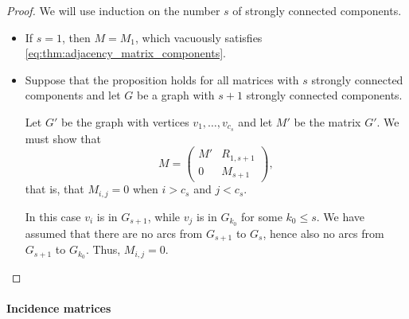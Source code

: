 \begin{proof}
  We will use induction on the number \( s \) of strongly connected components.
  \begin{itemize}
    \item If \( s = 1 \), then \( M = M_1 \), which vacuously satisfies \eqref{eq:thm:adjacency_matrix_components}.
    \item Suppose that the proposition holds for all matrices with \( s \) strongly connected components and let \( G \) be a graph with \( s + 1 \) strongly connected components.

    Let \( G' \) be the graph with vertices \( v_1, \ldots, v_{c_s} \) and let \( M' \) be the matrix \( G' \). We must show that
    \begin{equation*}
      M = \begin{pmatrix}
        M' & R_{1,s+1} \\
        0  & M_{s+1}
      \end{pmatrix},
    \end{equation*}
    that is, that \( M_{i,j} = 0 \) when \( i > c_s \) and \( j < c_s \).

    In this case \( v_i \) is in \( G_{s+1} \), while \( v_j \) is in \( G_{k_0} \) for some \( k_0 \leq s \). We have assumed that there are no arcs from \( G_{s+1} \) to \( G_s \), hence also no arcs from \( G_{s+1} \) to \( G_{k_0} \). Thus, \( M_{i,j} = 0 \).
  \end{itemize}
\end{proof}

\paragraph{Incidence matrices}

